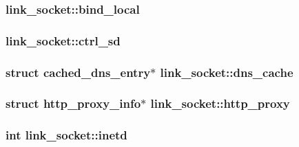 \subsubsection[{bind\+\_\+local}]{ link\+\_\+socket\+::bind\+\_\+local}\label{structlink__socket_a5d0273818bc55dd3be2a9b856816659e}
\hypertarget{structlink__socket_aa7175ad31d03505bc3e4ae9cee7b01d9}{}
\subsubsection[{ctrl\+\_\+sd}]{ link\+\_\+socket\+::ctrl\+\_\+sd}\label{structlink__socket_aa7175ad31d03505bc3e4ae9cee7b01d9}
\hypertarget{structlink__socket_acb1f6f8229c3d38364d74d7a88c7c09d}{}
\subsubsection[{dns\+\_\+cache}]{\setlength{\rightskip}{0pt plus 5cm}struct {\bf cached\+\_\+dns\+\_\+entry}$\ast$ link\+\_\+socket\+::dns\+\_\+cache}\label{structlink__socket_acb1f6f8229c3d38364d74d7a88c7c09d}
\hypertarget{structlink__socket_acb1c75e94b2fdd9f85484e5ec6ef0848}{}
\subsubsection[{http\+\_\+proxy}]{\setlength{\rightskip}{0pt plus 5cm}struct {\bf http\+\_\+proxy\+\_\+info}$\ast$ link\+\_\+socket\+::http\+\_\+proxy}\label{structlink__socket_acb1c75e94b2fdd9f85484e5ec6ef0848}
\hypertarget{structlink__socket_a3b8f6b6038fc694204d898d0417cf4f0}{}
\subsubsection[{inetd}]{\setlength{\rightskip}{0pt plus 5cm}int link\+\_\+socket\+::inetd}\label{structlink__socket_a3b8f6b6038fc694204d898d0417cf4f0}
\hypertarget{structlink__socket_a4758d694c759a1aab884bc1cc5ab969f}{}
